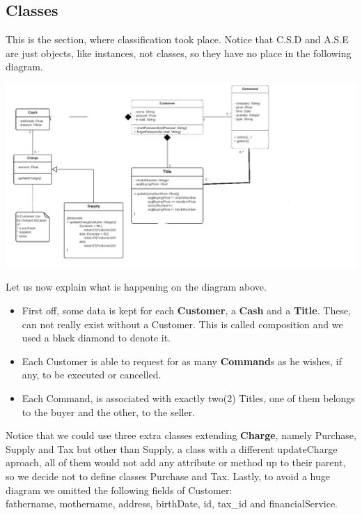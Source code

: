 \documentclass{article}
\begin{document}
\newpage
\subsection{Classes}
This is the section, where classification took place. Notice that C.S.D and A.S.E are just objects, like instances, not classes, so they have no place in the following diagram.\\
\begin{center}
	\includegraphics[scale=0.5]{classesII}\\
\end{center}
Let us now explain what is happening on the diagram above.\\
\begin{itemize}
\item First off, some data is kept for each \textbf{Customer}, a \textbf{Cash} and a \textbf{Title}. 
These, can not really exist without a Customer. 
This is called composition and we used a black diamond to denote it.
\item Each Customer is able to request for as many \textbf{Command}s as he wishes, if any, to be executed or cancelled.
\item Each Command, is associated with exactly two(2) Titles, one of them belongs to the buyer and the other, to the seller. 
\end{itemize}
Notice that we could use three extra classes extending \textbf{Charge}, namely Purchase, Supply and Tax but other than Supply, a class with a different updateCharge aproach, all of them would not add any attribute or method up to their parent, so we decide not to define classes Purchase and Tax. Lastly, to avoid a huge diagram we omitted the following fields of Customer:\\  
fathername, mothername, address, birthDate, id, tax{\_}id and financialService.
   
\end{document}
